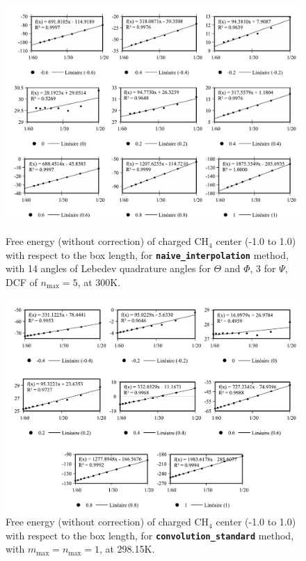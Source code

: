 \begin{figure}[!tbph]
\begin{centering}
\includegraphics[width=0.95\columnwidth]{_figure/results/ch4_nmax5_inter}
\par\end{centering}
\caption[Original free energy of charged $\mathrm{C}\mathrm{H}_{4}$, ``naive\_interpolation''
with DCF of $n_{\max}=5$]{Free energy (without correction) of charged $\mathrm{C}\mathrm{H}_{4}$
center (-1.0 to 1.0) with respect to the box length, for \texttt{\textbf{naive\_interpolation}}
method, with 14 angles of Lebedev quadrature angles for $\Theta$
and $\Phi$, 3 for $\Psi$, DCF of $n_{\max}=5$, at 300K.\label{fig:ch4_nmax5_inter}}

\vspace{0.33cm}

\begin{centering}
\includegraphics[width=0.95\columnwidth]{_figure/results/ch4_nmax1_new}
\par\end{centering}
\caption[Original free energy of charged $\mathrm{C}\mathrm{H}_{4}$, ``convolution\_standard''
with DCF of $n_{\max}=1$]{Free energy (without correction) of charged $\mathrm{C}\mathrm{H}_{4}$
center (-1.0 to 1.0) with respect to the box length, for \texttt{\textbf{convolution\_standard}}
method, with $m_{\max}=n_{\max}=1$, at 298.15K.\label{fig:ch4_nmax1_new}}
\end{figure}

